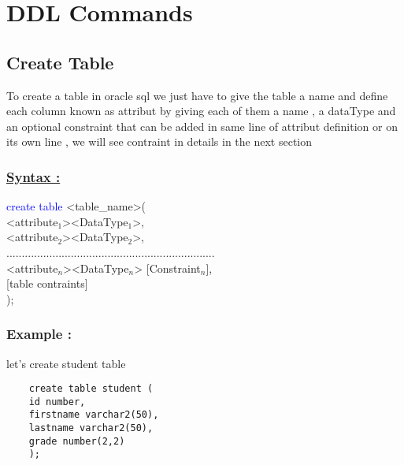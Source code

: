 \section{DDL Commands}
\subsection{Create Table}
\begin{tcolorbox}[title = Definition]
To create a table in oracle sql we just have to give the table a name and define each column known as attribut
by giving each of them a name , a dataType and an optional constraint that can be added in same line of
attribut definition or on its own line , we will see contraint in details in the next section
\end{tcolorbox}

\vspace{0.5cm}
\subsubsection*{\underline{Syntax :}}
\begin{tcolorbox}[title = Table Creation]

\textcolor{blue}{create table} \textless table\_name\textgreater (\\
\textless attribute$_{1}$\textgreater \quad \textless DataType$_{1}$\textgreater \quad {[Constraint$_{1}$]},\\
\textless attribute$_{2}$\textgreater \quad \textless DataType$_{2}$\textgreater \quad {[Constraint$_{2}$]},\\
....................................................................\\
\textless attribute$_{n}$\textgreater \quad \textless DataType$_{n}$\textgreater \hspace{0.15cm} {[Constraint$_{n}$]},\\
{[table contraints]}\\
);
\end{tcolorbox}

\vspace{0.5cm}
\subsubsection*{Example :} let's create student table 
\begin{lstlisting}
    create table student (
    id number,
    firstname varchar2(50),
    lastname varchar2(50),
    grade number(2,2)
    );
\end{lstlisting}

